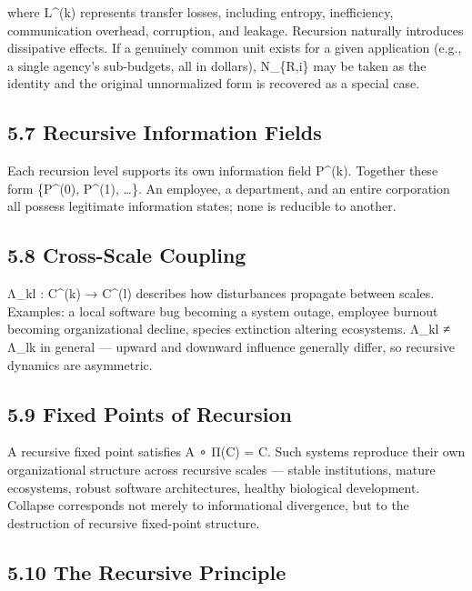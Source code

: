 \documentclass[
]{article}
\begin{document}
where L\^{}(k) represents transfer losses, including entropy,
inefficiency, communication overhead, corruption, and leakage. Recursion
naturally introduces dissipative effects. If a genuinely common unit
exists for a given application (e.g., a single agency's sub-budgets, all
in dollars), N\_\{R,i\} may be taken as the identity and the original
unnormalized form is recovered as a special case.

\hypertarget{recursive-information-fields}{%
\subsection{5.7 Recursive Information
Fields}\label{recursive-information-fields}}

Each recursion level supports its own information field P\^{}(k).
Together these form \{P\^{}(0), P\^{}(1), \ldots\}. An employee, a
department, and an entire corporation all possess legitimate information
states; none is reducible to another.

\hypertarget{cross-scale-coupling}{%
\subsection{5.8 Cross-Scale Coupling}\label{cross-scale-coupling}}

Λ\_kl : C\^{}(k) → C\^{}(l) describes how disturbances propagate between
scales. Examples: a local software bug becoming a system outage,
employee burnout becoming organizational decline, species extinction
altering ecosystems. Λ\_kl ≠ Λ\_lk in general --- upward and downward
influence generally differ, so recursive dynamics are asymmetric.

\hypertarget{fixed-points-of-recursion}{%
\subsection{5.9 Fixed Points of
Recursion}\label{fixed-points-of-recursion}}

A recursive fixed point satisfies A ∘ Π(C) = C. Such systems reproduce
their own organizational structure across recursive scales --- stable
institutions, mature ecosystems, robust software architectures, healthy
biological development. Collapse corresponds not merely to informational
divergence, but to the destruction of recursive fixed-point structure.

\hypertarget{the-recursive-principle}{%
\subsection{5.10 The Recursive
Principle}\label{the-recursive-principle}}
\end{document}
